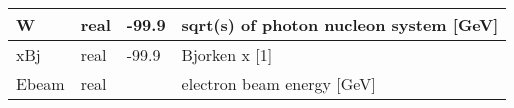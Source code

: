 \documentclass{article}
\begin{document}
\begin{longtable}{llll}
\midrule
W & \begin{minipage}[t]{2cm}real\end{minipage} & \begin{minipage}[t]{2cm}-99.9\end{minipage} & \begin{minipage}[t]{12cm}sqrt(s) of photon nucleon system [GeV]\end{minipage}\\*
\midrule
xBj & \begin{minipage}[t]{2cm}real\end{minipage} & \begin{minipage}[t]{2cm}-99.9\end{minipage} & \begin{minipage}[t]{12cm}Bjorken x [1]\end{minipage}\\*
\midrule
Ebeam & \begin{minipage}[t]{2cm}real\end{minipage} & \begin{minipage}[t]{2cm}\end{minipage} & \begin{minipage}[t]{12cm}electron beam energy [GeV]\end{minipage}\\*
\bottomrule
\end{longtable}
{ }



\end{document}
